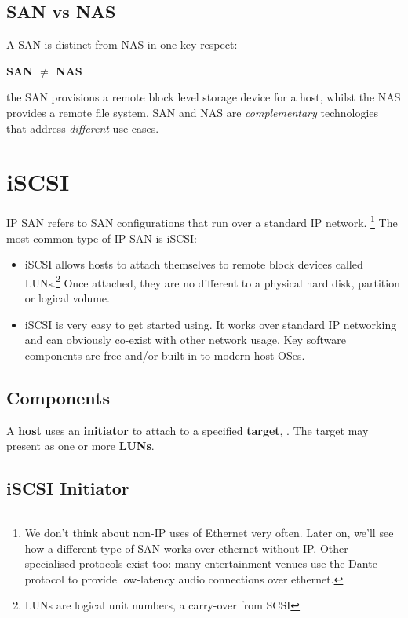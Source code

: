 \subsection{SAN vs NAS}
\label{sec:san-vs-nas}

A SAN is distinct from NAS in one key respect:

\textbf{SAN \(\ne\) NAS}

the SAN provisions a remote block level storage device for a host,
whilst the NAS provides a remote file system. SAN and NAS are
\emph{complementary} technologies that address \emph{different} use
cases.

\section{iSCSI}
\label{sec:iscsi}

IP SAN refers to SAN configurations that run over a standard IP network.
\footnote{We don't think about non-IP uses of Ethernet very often. Later
  on, we'll see how a different type of SAN works over ethernet without
  IP. Other specialised protocols exist too: many entertainment venues
  use the Dante protocol to provide low-latency audio connections over
  ethernet.} The most common type of IP SAN is iSCSI:

\begin{itemize}
\item
  iSCSI allows hosts to attach themselves to remote block devices called
  LUNs.\footnote{LUNs are logical unit numbers, a carry-over from SCSI}
  Once attached, they are no different to a physical hard disk,
  partition or logical volume.
\item
  iSCSI is very easy to get started using. It works over standard IP
  networking and can obviously co-exist with other network usage. Key
  software components are free and/or built-in to modern host OSes.
\end{itemize}

\subsection{Components}
\label{sec:components}

A \textbf{host} uses an \textbf{initiator} to attach to a specified
\textbf{target}, . The target may present as one or more \textbf{LUNs}.


\subsection{iSCSI Initiator}
\label{sec:iscsi-initiator}

